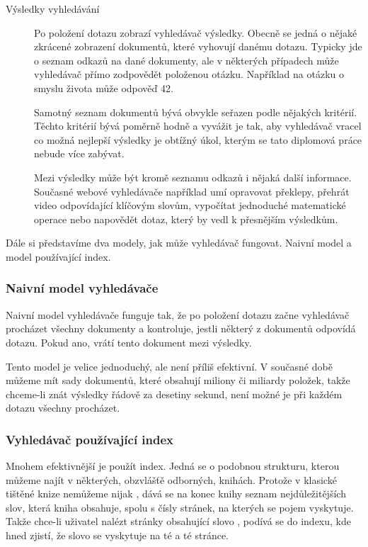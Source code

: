 \documentclass[12pt]{article}
\begin{document}
\begin{description}
\item[Výsledky vyhledávání] Po položení dotazu zobrazí vyhledávač výsledky. Obecně se jedná o nějaké zkrácené zobrazení dokumentů, které vyhovují danému dotazu. Typicky jde o seznam odkazů na dané dokumenty, ale v některých případech může vyhledávač přímo zodpovědět položenou otázku. Například na otázku o smyslu života může odpověď 42. 

Samotný seznam dokumentů bývá obvykle seřazen podle nějakých kritérií. Těchto kritérií bývá poměrně hodně a vyvážit je tak, aby vyhledávač vracel co možná nejlepší výsledky je obtížný úkol, kterým se tato diplomová práce nebude více zabývat. 

Mezi výsledky může být kromě seznamu odkazů i nějaká další informace. Současné webové vyhledávače například umí opravovat překlepy, přehrát video odpovídající klíčovým slovům, vypočítat jednoduché matematické operace nebo napovědět dotaz, který by vedl k přesnějším výsledkům. 
\end{description}


Dále si představíme dva modely, jak může vyhledávač fungovat. Naivní model a model používající index.

\subsubsection{Naivní model vyhledávače}

Naivní model vyhledávače funguje tak, že po položení dotazu začne vyhledávač procházet všechny dokumenty a kontroluje, jestli některý z dokumentů odpovídá dotazu. Pokud ano, vrátí tento dokument mezi výsledky. 

Tento model je velice jednoduchý, ale není příliš efektivní. V současné době můžeme mít sady dokumentů, které obsahují miliony či miliardy položek, takže chceme-li znát výsledky řádově za desetiny sekund, není možné je při každém dotazu všechny procházet.

\subsubsection{Vyhledávač používající index}
Mnohem efektivnější je použít index. Jedná se o podobnou strukturu, kterou můžeme najít v některých, obzvlášťě odborných, knihách. Protože v klasické tištěné knize nemůžeme nijak , dává se na konec knihy seznam nejdůležitějších slov, která kniha obsahuje, spolu s čísly stránek, na kterých se pojem vyskytuje. Takže chce-li uživatel nalézt stránky obsahující slovo , podívá se do indexu, kde hned zjistí, že slovo se vyskytuje na té a té stránce. 
\end{document}
